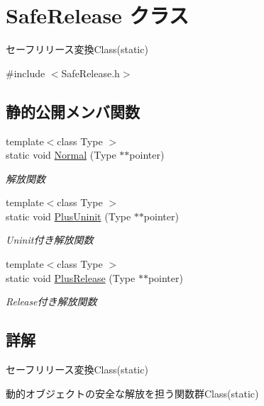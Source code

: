 \hypertarget{class_safe_release}{}\section{Safe\+Release クラス}
\label{class_safe_release}


セーフリリース変換\+Class(static)  




{\ttfamily \#include $<$Safe\+Release.\+h$>$}

\subsection*{静的公開メンバ関数}
\begin{DoxyCompactItemize}
\item 
{\footnotesize template$<$class Type $>$ }\\static void \mbox{\hyperlink{class_safe_release_a6ecab682df939c28d8867a67c2f4b51f}{Normal}} (Type $\ast$$\ast$pointer)
\begin{DoxyCompactList}\small\item\em 解放関数 \end{DoxyCompactList}\item 
{\footnotesize template$<$class Type $>$ }\\static void \mbox{\hyperlink{class_safe_release_a06160f5466a88f021e6f28489de9df1e}{Plus\+Uninit}} (Type $\ast$$\ast$pointer)
\begin{DoxyCompactList}\small\item\em Uninit付き解放関数 \end{DoxyCompactList}\item 
{\footnotesize template$<$class Type $>$ }\\static void \mbox{\hyperlink{class_safe_release_a507950335a85da67c1722cce83dca9ae}{Plus\+Release}} (Type $\ast$$\ast$pointer)
\begin{DoxyCompactList}\small\item\em Release付き解放関数 \end{DoxyCompactList}\end{DoxyCompactItemize}


\subsection{詳解}
セーフリリース変換\+Class(static) 

動的オブジェクトの安全な解放を担う関数群\+Class(static) 

